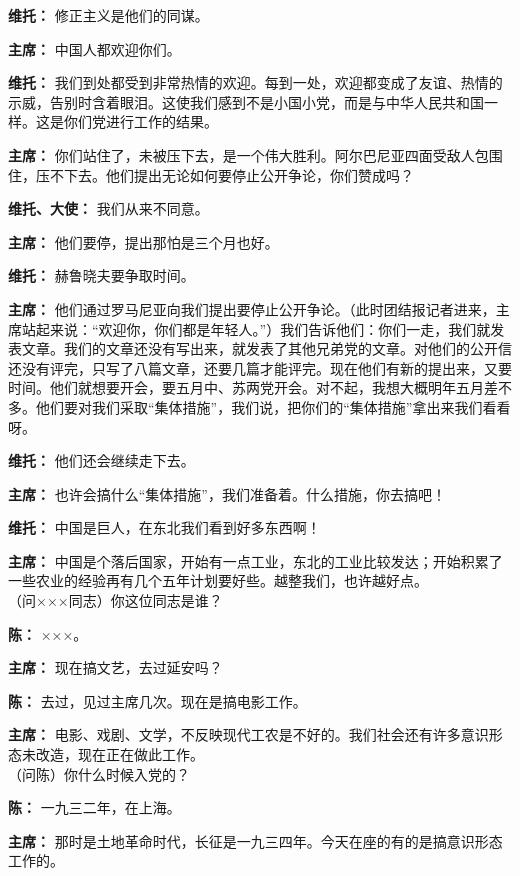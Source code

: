 \begin{duihua}
\item[\textbf{维托：}]{修正主义是他们的同谋。}
\item[\textbf{主席：}]{中国人都欢迎你们。}
\item[\textbf{维托：}]{我们到处都受到非常热情的欢迎。每到一处，欢迎都变成了友谊、热情的示威，告别时含着眼泪。这使我们感到不是小国小党，而是与中华人民共和国一样。这是你们党进行工作的结果。}
\item[\textbf{主席：}]{你们站住了，未被压下去，是一个伟大胜利。阿尔巴尼亚四面受敌人包围住，压不下去。他们提出无论如何要停止公开争论，你们赞成吗？}
\item[\textbf{维托、大使：}]{我们从来不同意。}
\item[\textbf{主席：}]{他们要停，提出那怕是三个月也好。}
\item[\textbf{维托：}]{赫鲁晓夫要争取时间。}
\item[\textbf{主席：}]{他们通过罗马尼亚向我们提出要停止公开争论。（此时团结报记者进来，主席站起来说：“欢迎你，你们都是年轻人。”）我们告诉他们：你们一走，我们就发表文章。我们的文章还没有写出来，就发表了其他兄弟党的文章。对他们的公开信还没有评完，只写了八篇文章，还要几篇才能评完。现在他们有新的提出来，又要时间。他们就想要开会，要五月中、苏两党开会。对不起，我想大概明年五月差不多。他们要对我们采取“集体措施”，我们说，把你们的“集体措施”拿出来我们看看呀。}
\item[\textbf{维托：}]{他们还会继续走下去。}
\item[\textbf{主席：}]{也许会搞什么“集体措施”，我们准备着。什么措施，你去搞吧！}
\item[\textbf{维托：}]{中国是巨人，在东北我们看到好多东西啊！}
\item[\textbf{主席：}]{中国是个落后国家，开始有一点工业，东北的工业比较发达；开始积累了一些农业的经验再有几个五年计划要好些。越整我们，也许越好点。\\（问×××同志）你这位同志是谁？
}
\item[\textbf{陈：}]{×××。}
\item[\textbf{主席：}]{现在搞文艺，去过延安吗？}
\item[\textbf{陈：}]{去过，见过主席几次。现在是搞电影工作。}
\item[\textbf{主席：}]{电影、戏剧、文学，不反映现代工农是不好的。我们社会还有许多意识形态未改造，现在正在做此工作。\\（问陈）你什么时候入党的？}
\item[\textbf{陈：}]{一九三二年，在上海。}
\item[\textbf{主席：}]{那时是土地革命时代，长征是一九三四年。今天在座的有的是搞意识形态工作的。}

\end{duihua}

